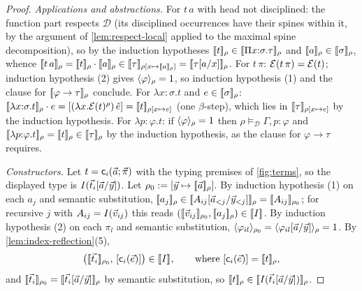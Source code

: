 \begin{proof}
\emph{Applications and abstractions.}  For $t\,a$ with head not
disciplined: the function part respects $\mathcal{D}$ (its disciplined
occurrences have their spines within it, by the argument of
\cref{lem:respect-local} applied to the maximal spine decomposition),
so by the induction hypotheses $[\![ t ]\!]_\rho \in [\![ \Pi
x{:}\sigma.\tau ]\!]_{\rho}$ and $[\![ a ]\!]_\rho \in [\![ \sigma ]\!]_{\rho}$,
whence $\sem{t\,a}_\rho = \sem{t}_\rho \cdot \sem{a}_\rho \in
\semr{\tau}{\rho[x \mapsto \sem{a}_\rho]} =
\semr{\subst{\tau}{a}{x}}{\rho}$.  For $t\,\pi$: $\mathcal{E}(t\,\pi) =
\mathcal{E}(t)$; induction hypothesis (2) gives $\langle \varphi \rangle_{\rho} = 1$,
so induction hypothesis (1) and the clause for $[\![ \varphi \to
\tau ]\!]_{\rho}$ conclude.  For $\lambda x{:}\sigma.t$ and $e \in
[\![ \sigma ]\!]_{\rho}$: $[\![ \lambda x{:}\sigma.t ]\!]_\rho \cdot e =
[(\lambda x.\mathcal{E}(t)^\rho)\,\hat{e}] = [\![ t ]\!]_{\rho[x \mapsto
e]}$ (one $\beta$-step), which lies in $[\![ \tau ]\!]_{\rho[x \mapsto e]}$
by the induction hypothesis.  For $\lambda p{:}\varphi.t$: if
$\langle \varphi \rangle_{\rho} = 1$ then $\rho \vDash_{\mathcal{D}} \Gamma,
p{:}\varphi$ and $[\![ \lambda p{:}\varphi.t ]\!]_\rho = [\![ t ]\!]_\rho \in
[\![ \tau ]\!]_{\rho}$ by the induction hypothesis, as the clause for
$\varphi \to \tau$ requires.

\emph{Constructors.}  Let $t = \mathsf{c}_i(\vec{a}; \vec{\pi})$ with the
typing premises of \cref{fig:terms}, so the displayed type is
$I(\vec{t}_i[\vec{a}/\vec{y}])$.  Let $\rho_0 \mathrel{:=} [\vec{y} \mapsto
[\![ \vec{a} ]\!]_\rho]$.  By induction hypothesis (1) on each $a_j$ and
semantic substitution, $[\![ a_j ]\!]_\rho \in
[\![ A_{ij}[\vec{a}_{<j}/\vec{y}_{<j}] ]\!]_{\rho} =
[\![ A_{ij} ]\!]_{\rho_0}$; for recursive $j$ with $A_{ij} =
I(\vec{v}_{ij})$ this reads $([\![ \vec{v}_{ij} ]\!]_{\rho_0},
[\![ a_j ]\!]_\rho) \in [\![ I ]\!]_{}$.  By induction hypothesis (2) on each
$\pi_l$ and semantic substitution,
$\langle \varphi_{il} \rangle_{\rho_0} =
\langle \varphi_{il}[\vec{a}/\vec{y}] \rangle_{\rho} = 1$.  By
\cref{lem:index-reflection}(5),
\[
  \bigl([\![ \vec{t}_i ]\!]_{\rho_0},\, [\mathsf{c}_i(\vec{e})]\bigr) \in
  [\![ I ]\!]_{},
  \qquad \text{where } [\mathsf{c}_i(\vec{e})] = [\![ t ]\!]_\rho,
\]
and $[\![ \vec{t}_i ]\!]_{\rho_0} =
[\![ \vec{t}_i[\vec{a}/\vec{y}] ]\!]_{\rho}$ by semantic substitution, so
$[\![ t ]\!]_\rho \in [\![ I(\vec{t}_i[\vec{a}/\vec{y}]) ]\!]_{\rho}$.


\end{proof}

